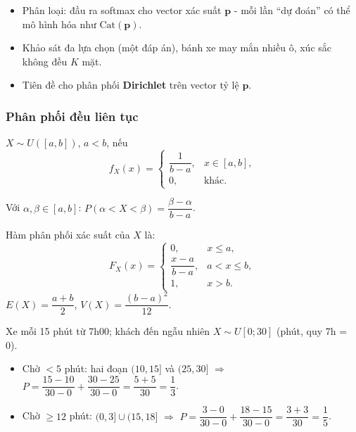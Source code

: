 \documentclass[12pt,a4paper]{article}
\begin{document}
\begin{ynghia}[title={Ứng dụng}]
  \begin{itemize}
    \item Phân loại: đầu ra softmax cho vector xác suất $\mathbf{p}$ - mỗi lần ``dự đoán'' có thể mô hình hóa như $\mathrm{Cat}(\mathbf{p})$.
    \item Khảo sát đa lựa chọn (một đáp án), bánh xe may mắn nhiều ô, xúc sắc không đều $K$ mặt.
    \item Tiên đề cho phân phối \textbf{Dirichlet} trên vector tỷ lệ $\mathbf{p}$.
  \end{itemize}
\end{ynghia}

\subsubsection{Phân phối đều liên tục}

\begin{dinhnghia}
  $X \sim U([a,b])$, $a < b$, nếu
  \[
    f_X(x) = \begin{cases}
      \dfrac{1}{b-a}, & x \in [a,b], \\
      0, & \text{khác}.
    \end{cases}
  \]
\end{dinhnghia}

\begin{tinhchat}
  Với $\alpha, \beta \in [a,b]$: $P(\alpha < X < \beta) = \dfrac{\beta - \alpha}{b - a}$.
\end{tinhchat}

\begin{dinhly}
Hàm phân phối xác suất của $X$ là:
  \[
    F_X(x) = \begin{cases}
      0, & x \le a, \\
      \dfrac{x-a}{b-a}, & a < x \le b, \\
      1, & x > b.
    \end{cases}
  \]
  $E(X) = \dfrac{a+b}{2}$, \quad $V(X) = \dfrac{(b-a)^2}{12}$.
\end{dinhly}

\begin{vidu}[title={Chờ xe buýt}]
Xe mỗi 15 phút từ 7h00; khách đến ngẫu nhiên $X \sim U[0;30]$ (phút, quy 7h = 0).
\begin{itemize}
  \item Chờ $< 5$ phút: hai đoạn $(10,15]$ và $(25,30]$ $\Rightarrow$ $P = \dfrac{15-10}{30-0} + \dfrac{30-25}{30-0} = \dfrac{5+5}{30} = \dfrac{1}{3}$.
  \item Chờ $\ge 12$ phút: $(0,3] \cup (15,18]$ $\Rightarrow$ $P = \dfrac{3-0}{30-0} + \dfrac{18-15}{30-0} = \dfrac{3+3}{30} = \dfrac{1}{5}$.
\end{itemize}
\end{vidu}
\end{document}
